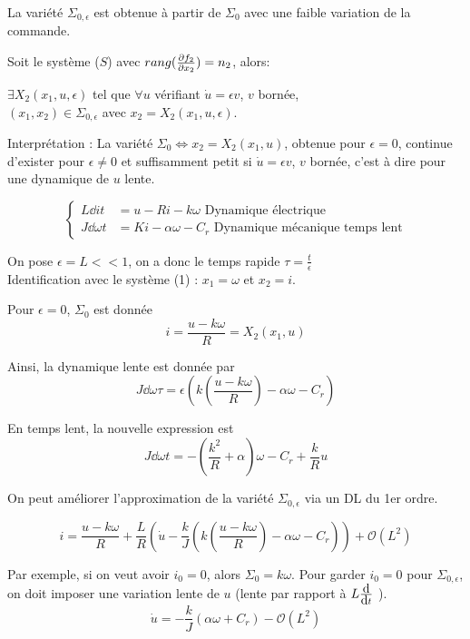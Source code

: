 \documentclass[main.tex]{subfiles}
\begin{document}
La variété $\Sigma_{0,\epsilon}$ est obtenue à partir de $\Sigma_0$ avec une faible variation de la commande.

\begin{prop}
  Soit le système ($S$) avec $rang(\derivp[f_2]{x_2}) = n_2$, alors: \\
  \begin{center}
  $\exists X_2(x_1,u,\epsilon)$ tel que $\forall u$ vérifiant $\dot{u} = \epsilon v$, $v$ bornée, \\ $(x_1,x_2) \in \Sigma_{0,\epsilon}$ avec $x_2 = X_2(x_1,u,\epsilon)$.
\end{center}
\end{prop}

Interprétation :
La variété $\Sigma_0 \Leftrightarrow x_2=X_2(x_1,u)$, obtenue pour $\epsilon=0$, continue d'exister pour $\epsilon \neq 0$ et suffisamment petit si $\dot{u}=\epsilon v$, $v$ bornée, c'est à dire pour une dynamique de $u$ lente.


\begin{exemple}[MCC]
\[
    \begin{cases}

    L\dd{i}{t} & = u-Ri - k\omega \text{ Dynamique électrique}\\
    J\dd{\omega}{t} & = Ki - \alpha\omega -C_r \text{ Dynamique mécanique temps lent}
  \end{cases}
\]

On pose $\epsilon = L << 1$,  on a donc le temps rapide $\tau = \frac{t}{\epsilon}$\\

Identification avec le système (1) : $x_1=\omega$ et $x_2 =i$.

Pour $\epsilon=0$, $\Sigma_0$ est donnée 
\[ i = \frac{u-k\omega}{R} = X_2(x_1,u) \]

Ainsi, la dynamique lente est donnée par 
\[ J \dd{\omega}{\tau} = \epsilon(k(\frac{u-k\omega}{R}) - \alpha \omega - C_r) \]

En temps lent, la nouvelle expression est 
\[ J \dd{\omega}{t} = -(\frac{k^2}{R}+\alpha) \omega - C_r + \frac{k}{R}u \]

On peut améliorer l'approximation de la variété $\Sigma_{0,\epsilon}$ via un DL du 1er ordre.

\[ i = \frac{u-k\omega}{R} + \frac{L}{R}(\dot{u}-\frac{k}{J}(k(\frac{u-k\omega}{R})-\alpha\omega-C_r)) + \mathcal{O}(L^2) \]

Par exemple, si on veut avoir $i_0=0$, alors $\Sigma_0 = k\omega$. Pour garder $i_0=0$ pour $\Sigma_{0,\epsilon}$, on doit imposer une variation lente de $u$ (lente par rapport à $L\deriv[]{t}$ ).
\[ \dot{u} = -\frac{k}{J}(\alpha\omega+C_r) - \mathcal{O}(L^2) \]
\end{exemple}
\end{document}
